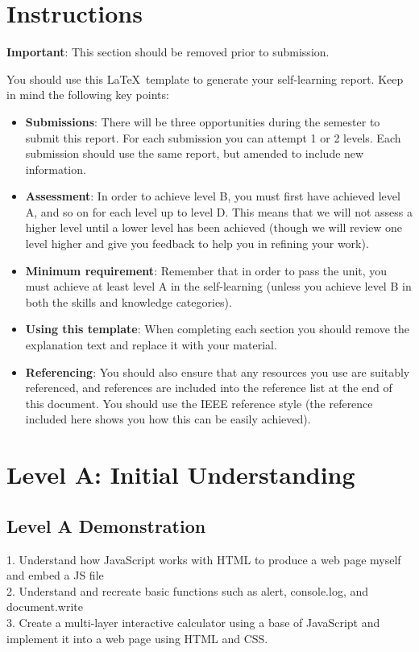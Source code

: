 \documentclass[a4paper, 11pt]{report}
\begin{document}
\tableofcontents


\newpage
\section*{Instructions}

\textbf{Important}: This section should be removed prior to submission.

You should use this \LaTeX\ template to generate your self-learning report. Keep in mind the following key points:
\begin{itemize}
	\item \textbf{Submissions}: There will be three opportunities during the semester to submit this report. For each submission you can attempt 1 or 2 levels. Each submission should use the same report, but amended to include new information.
	\item \textbf{Assessment}: In order to achieve level B, you must first have achieved level A, and so on for each level up to level D. This means that we will not assess a higher level until a lower level has been achieved (though we will review one level higher and give you feedback to help you in refining your work).
	\item \textbf{Minimum requirement}: Remember that in order to pass the unit, you must achieve at least level A in the self-learning (unless you achieve level B in both the skills and knowledge categories).
	\item \textbf{Using this template}: When completing each section you should remove the explanation text and replace it with your material.
	\item \textbf{Referencing}: You should also ensure that any resources you use are suitably referenced, and references are included into the reference list at the end of this document. You should use the IEEE reference style \cite{usyd2} (the reference included here shows you how this can be easily achieved).
\end{itemize}




\newpage
\section{Level A: Initial Understanding}
\vspace{5mm}
\subsection{Level A Demonstration}
1. Understand how JavaScript works with HTML to produce a web page myself and embed a JS file  \\ 2. Understand and recreate basic functions such as alert, console.log, and document.write \\ 3. Create a multi-layer interactive calculator using a base of JavaScript and implement it into a web page using HTML and CSS.
\end{document}
